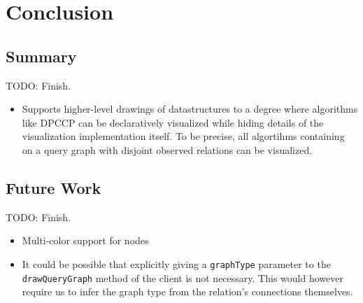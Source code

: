 \section{Conclusion}

\subsection{Summary}

TODO: Finish.

\begin{itemize}
    \item Supports higher-level drawings of datastructures to a degree where algorithms like DPCCP can be declaratively visualized while hiding details of the visualization implementation itself. To be precise, all algortihms containing on a query graph with disjoint observed relations can be visualized.
\end{itemize}





\subsection{Future Work}

TODO: Finish.

\begin{itemize}
    \item Multi-color support for nodes
    \item It could be possible that explicitly giving a \texttt{graphType} parameter to the \texttt{drawQueryGraph} method of the client is not necessary. This would however require us to infer the graph type from the relation's connections themselves.
\end{itemize}

